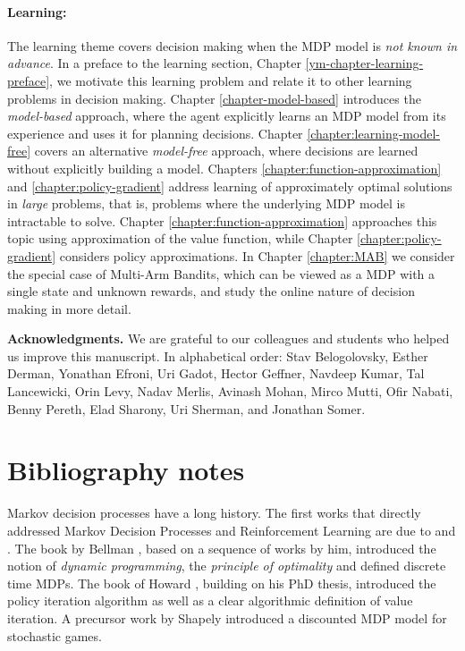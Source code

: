 \paragraph{Learning:} The learning theme covers decision making when the MDP model is \textit{not known in advance}. In a preface to the learning section, Chapter \ref{ym-chapter-learning-preface}, we motivate this learning problem and relate it to other learning problems in decision making.
Chapter \ref{chapter-model-based} introduces the \textit{model-based} approach, where the agent explicitly learns an MDP model from its experience and uses it for planning decisions. Chapter \ref{chapter:learning-model-free} covers an alternative \textit{model-free} approach, where decisions are learned without explicitly building a model. Chapters \ref{chapter:function-approximation} and \ref{chapter:policy-gradient} address learning of approximately optimal solutions in \textit{large} problems, that is, problems where the underlying MDP model is intractable to solve. Chapter \ref{chapter:function-approximation} approaches this topic using approximation of the value function, while Chapter \ref{chapter:policy-gradient} considers policy approximations. In Chapter \ref{chapter:MAB} we consider the special case of Multi-Arm Bandits, which can be viewed as a MDP with a single state and unknown rewards, and study the online nature of decision making in more detail. 

{\bf Acknowledgments.} We are grateful to our colleagues and students who helped us improve this manuscript. In alphabetical 
order:
Stav Belogolovsky,
Esther Derman,
Yonathan Efroni,
Uri Gadot,
Hector Geffner, Navdeep Kumar,
Tal Lancewicki,
Orin Levy,
Nadav Merlis,
Avinash Mohan,
Mirco Mutti, 
Ofir Nabati,
Benny Pereth,
Elad Sharony,
Uri Sherman, and
Jonathan Somer.

\section{Bibliography notes}

Markov decision processes have a long history. The first works that directly addressed Markov Decision Processes and Reinforcement Learning are due to \cite{Bellman:DynamicProgramming} and \cite{Howard1960}. The book by Bellman \cite{Bellman:DynamicProgramming}, based on a sequence of works by him, introduced the notion of \emph{dynamic programming}, the \emph{principle of optimality} and defined discrete time MDPs. The book of Howard \cite{Howard1960}, building on his PhD thesis, introduced the policy iteration algorithm as well as a clear algorithmic definition of value iteration. A precursor work by Shapely \cite{Shapley53} introduced a discounted MDP model for stochastic games.

